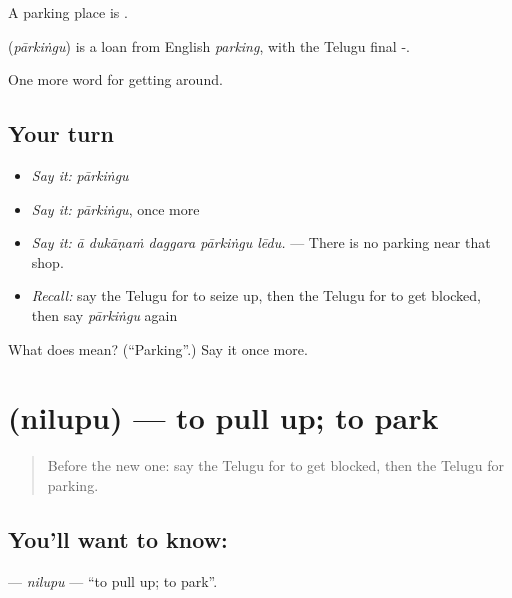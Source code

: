 A parking place is  .

\begin{cousinweb}
\textbf{} (\emph{pārkiṅgu}) is a loan from English \emph{parking}, with the Telugu final -.
\end{cousinweb}

\begin{grammarlens}[title={What you've built}]
One more word for getting around.
\end{grammarlens}

\subsection*{Your turn}
\begin{itemize}
\raggedright
  \item \emph{Say it:} \emph{pārkiṅgu}
  \item \emph{Say it:} \emph{pārkiṅgu}, once more
  \item \emph{Say it:} \emph{ā dukāṇaṁ daggara pārkiṅgu lēdu.} — There is no parking near that shop.
  \item \emph{Recall:} say the Telugu for to seize up, then the Telugu for to get blocked, then say \emph{pārkiṅgu} again
\end{itemize}

\begin{tcolorbox}[breakable,colback=teal!4,colframe=teal!35!black,title={Before you move on}]
What does  mean? (\textquotedblleft{}Parking\textquotedblright{}.) Say it once more.
\end{tcolorbox}
\section[\texorpdfstring{\te{నిలుపు} (nilupu)}{నిలుపు (nilupu)}]{ (nilupu) — to pull up; to park}

\label{lesson:TE-C450-nilupu}



\begin{quote}
Before the new one: say the Telugu for to get blocked, then the Telugu for parking.
\end{quote}

\subsection*{You'll want to know: }
\textbf{} — \emph{nilupu} — \textquotedblleft{}to pull up; to park\textquotedblright{}.

